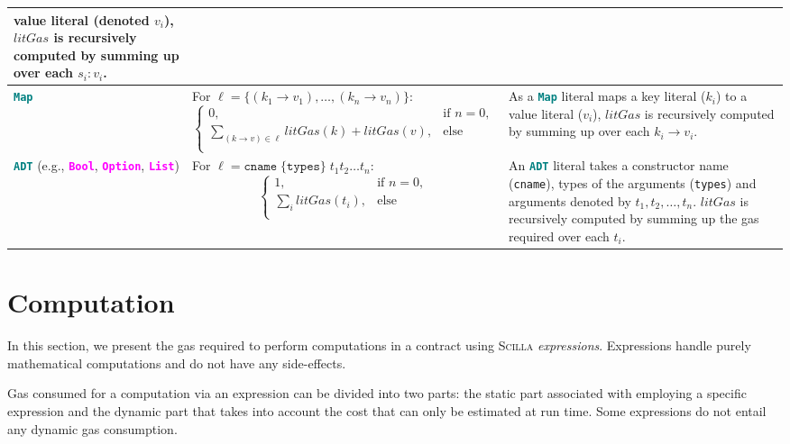 \documentclass[10pt]{article}
\begin{document}
\begin{table}[!hbt]
\begin{tabular}{|p{3cm}|p{6.7cm}|p{6cm}|}
		value literal (denoted $v_i$), $litGas$
		is recursively computed by summing up over each $s_i : v_i$.   \\ \hline
		\textbf{\texttt{\textcolor{teal}{Map}}} &
		For $\ell = \{(k_1 \rightarrow v_1), 
		\ldots, (k_n \rightarrow v_n)\}$:
		$$ \begin{cases}
    		0, & \text{if } n = 0,  \\
  			\sum_{(k \rightarrow v) \in \ell} {litGas(k) + litGas(v)},  &
    		\text{else } \\
  \end{cases}
		$$ & As a \textbf{\texttt{\textcolor{teal}{Map}}} literal maps a key literal ($k_i$) to a
		value literal ($v_i$),  $litGas$
		is recursively computed by summing up over each $k_i \rightarrow v_i$. \\ \hline
		\textbf{\texttt{\textcolor{teal}{ADT}}} (e.g.,
		\textbf{\textcolor{magenta}{\texttt{Bool}}},
		\textbf{\textcolor{magenta}{\texttt{Option}}},
		\textbf{\textcolor{magenta}{\texttt{List}}}) & For $\ell = \texttt{cname}\;
		\{\texttt{types}\} \; t_1 t_2 \ldots t_n $:
		$$ \begin{cases}
    		1, & \text{if } n = 0,  \\
  			\sum_{i} {litGas(t_i)},  &
    		\text{else } \\
  		\end{cases}
		$$ 
		
		& An \textbf{\texttt{\textcolor{teal}{ADT}}} literal takes a constructor name
		(\texttt{cname}), types of the arguments (\texttt{types}) and arguments
		denoted by $t_1, t_2, \ldots, t_n$. $litGas$ is recursively computed
		by summing up the gas required over each $t_i$. \\ \hline
	\end{tabular}
	\end{table}
 
\section{Computation}

In this section, we present the gas required to perform computations in a contract
using \textsc{Scilla} \emph{expressions}. Expressions handle purely
mathematical computations and do not have any side-effects. 

Gas consumed for a computation via an expression can be divided into two parts: the
static part associated with employing a specific expression and the dynamic
part that takes into account the cost that can only be estimated at run time.
Some expressions do not entail any dynamic gas consumption.
\end{document}
